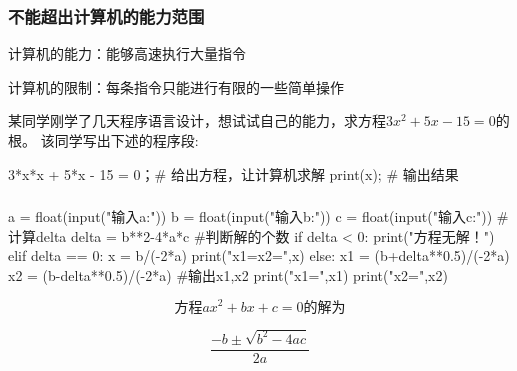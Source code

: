 \begin{frame}[fragile]
    \frametitle{不能超出计算机的能力范围}
    计算机的能力：能够高速执行大量指令

    计算机的限制：每条指令只能进行有限的一些简单操作

    \begin{example}
        某同学刚学了几天程序语言设计，想试试自己的能力，求方程$3x^2+5x-15=0$的根。
该同学写出下述的程序段:
    \end{example}
    \begin{codeblock}{}
    3*x*x + 5*x - 15 = 0；# 给出方程，让计算机求解
    print(x); # 输出结果
    \end{codeblock}
\end{frame}


\begin{frame}[fragile]
    \frametitle{}
    \begin{minipage}{0.48\linewidth}
        \begin{codeblock}{}
    a = float(input("输入a:"))   
    b = float(input("输入b:"))
    c = float(input("输入c:"))
    #计算delta
    delta = b**2-4*a*c
    #判断解的个数
    if delta < 0:
        print("方程无解！")
    elif delta == 0:
        x = b/(-2*a)
        print("x1=x2=",x)
    else:
        x1 = (b+delta**0.5)/(-2*a)
        x2 = (b-delta**0.5)/(-2*a)
    #输出x1,x2
    print("x1=",x1)
    print("x2=",x2)
            \end{codeblock}
    \end{minipage}\hfill
    \begin{minipage}{0.48\linewidth}
        \Large
        \[
            \text{方程} ax^2 + bx + c = 0 \text{的解为}
        \]

        \[
            \frac{-b \pm \sqrt{b^2 - 4ac}}{2a}
        \]
    \end{minipage}
    
\end{frame}


